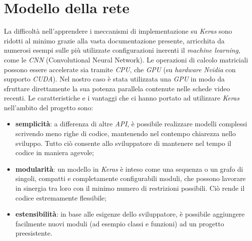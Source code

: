 \section{Modello della rete}
La difficoltà nell’apprendere i meccanismi di implementazione su \textit{Keras} sono ridotti al minimo grazie alla vasta documentazione presente, arricchita da numerosi esempi sulle più utilizzate configurazioni inerenti il \textit{machine learning}, come le \textit{CNN} (Convolutional Neural Network).
Le operazioni di calcolo matriciali possono essere accelerate sia tramite \textit{CPU}, che \textit{GPU} (su \textit{hardware} \textit{Nvidia} con supporto \textit{CUDA}). Nel nostro caso è stata utilizzata una \textit{GPU} in modo da sfruttare direttamente la sua potenza parallela contenute nelle schede video recenti.
\vspace*{2ex}
\vspace*{2ex}
\noindent Le caratteristiche e i vantaggi che ci hanno portato ad utilizzare \textit{Keras} nell’ambito del progetto sono:
\begin{itemize}
	\item \textbf{semplicità}: a differenza di altre \textit{API}, è possibile realizzare modelli complessi scrivendo meno righe di codice, mantenendo nel contempo chiarezza nello sviluppo. Tutto ciò consente allo sviluppatore di mantenere nel tempo il codice in maniera agevole;
	\item \textbf{modularità}: un modello in \textit{Keras} è inteso come una sequenza o un grafo di singoli, compatti e completamente configurabili moduli, che possono lavorare in sinergia tra loro con il minimo numero di restrizioni possibili. Ciò rende il codice estremamente flessibile;
	\item \textbf{estensibilità}: in base alle esigenze dello sviluppatore, è possibile aggiungere facilmente nuovi moduli (ad esempio classi e funzioni) ad un progetto preesistente.
\end{itemize}
